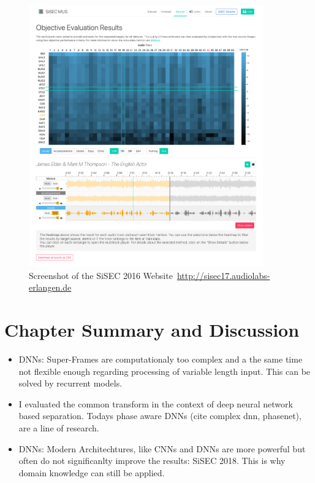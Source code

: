 \begin{figure}[t]
\centering
\includegraphics[width=0.9\textwidth]{Chapters/06_Separation_Unknown/figures/sisec_website.png}
\caption{Screenshot of the SiSEC 2016 Website~\url{http://sisec17.audiolabs-erlangen.de}}
\label{fig:sisec_website}

\end{figure}

\section{Chapter Summary and Discussion}

\begin{itemize}
  \item DNNs: Super-Frames are computationaly too complex and a the same time not flexible enough regarding processing of variable length input. This can be solved by recurrent models.
  \item I evaluated the common transform in the context of deep neural network based separation.
  Todays phase aware DNNs (cite complex dnn, phasenet), are a line of research.
  \item DNNs: Modern Architechtures, like CNNs and DNNs are more powerful but often do not significanlty improve the results: SiSEC 2018. This is why domain knowledge can still be applied.
\end{itemize}
